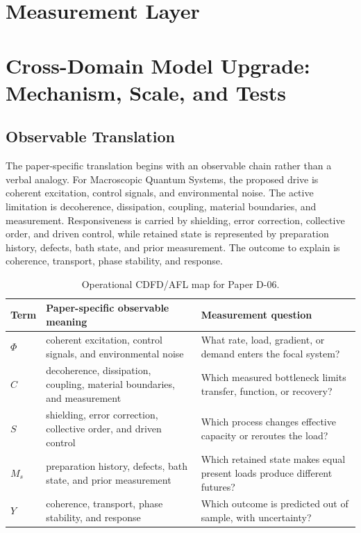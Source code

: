 \documentclass[11pt,a4paper]{article}
\begin{document}
\section{Measurement Layer}

\section{Cross-Domain Model Upgrade: Mechanism, Scale, and Tests}

\subsection{Observable Translation}

The paper-specific translation begins with an observable chain rather than a
verbal analogy. For Macroscopic Quantum Systems, the proposed drive is coherent excitation, control signals, and environmental noise.
The active limitation is decoherence, dissipation, coupling, material boundaries, and measurement. Responsiveness is carried by
shielding, error correction, collective order, and driven control, while retained state is represented by
preparation history, defects, bath state, and prior measurement. The outcome to explain is coherence, transport, phase stability, and response.

\begin{table}[htbp]
\centering
\small
\caption{Operational CDFD/AFL map for Paper D-06.}
\begin{tabularx}{\textwidth}{|l|X|X|}
\hline
\textbf{Term} & \textbf{Paper-specific observable meaning} & \textbf{Measurement question} \\
\hline
$\Phi$ & coherent excitation, control signals, and environmental noise & What rate, load, gradient, or demand enters the focal system? \\
\hline
$C$ & decoherence, dissipation, coupling, material boundaries, and measurement & Which measured bottleneck limits transfer, function, or recovery? \\
\hline
$S$ & shielding, error correction, collective order, and driven control & Which process changes effective capacity or reroutes the load? \\
\hline
$M_s$ & preparation history, defects, bath state, and prior measurement & Which retained state makes equal present loads produce different futures? \\
\hline
$Y$ & coherence, transport, phase stability, and response & Which outcome is predicted out of sample, with uncertainty? \\
\hline
\end{tabularx}
\end{table}
\end{document}
